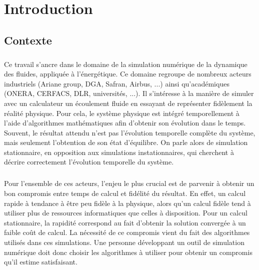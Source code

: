 \chapter*{Introduction}

  \section*{Contexte}

    \paragraph{}
    Ce travail s'ancre dans le domaine de la simulation numérique de la dynamique des fluides, appliquée à l'énergétique.
    Ce domaine regroupe de nombreux acteurs industriels (Ariane group, DGA, Safran, Airbus, ...) ainsi qu'académiques (ONERA, CERFACS, DLR, universités, ...).
    Il s'intéresse à la manière de simuler avec un calculateur un écoulement fluide en essayant de représenter fidèlement la réalité physique.
    Pour cela, le système physique est intégré temporellement à l'aide d'algorithmes mathématiques afin d'obtenir son évolution dans le temps.
    Souvent, le résultat attendu n'est pas l'évolution temporelle complète du système, mais seulement l'obtention de son état d'équilibre.
    On parle alors de simulation stationnaire, en opposition aux simulations instationnaires, qui cherchent à décrire correctement l'évolution temporelle du système.

    \paragraph{}
    Pour l'ensemble de ces acteurs, l'enjeu le plus crucial est de parvenir à obtenir un bon compromis entre temps de calcul et fidélité du résultat.
    En effet, un calcul rapide à tendance à être peu fidèle à la physique, alors qu'un calcul fidèle tend à utiliser plus de ressources informatiques que celles à disposition.
    Pour un calcul stationnaire, la rapidité correspond au fait d'obtenir la solution convergée à un faible coût de calcul.
    La nécessité de ce compromis vient du fait des algorithmes utilisés dans ces simulations.
    Une personne développant un outil de simulation numérique doit donc choisir les algorithmes à utiliser pour obtenir un compromis qu'il estime satisfaisant.

